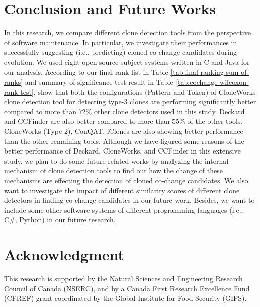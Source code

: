 \documentclass[review]{elsarticle}
\begin{document}
\section{Conclusion and Future Works}
\label{the-conclusion-cochange}
In this research, we compare different clone detection tools from the perspective of software maintenance. In particular, we investigate their performances in successfully suggesting (i.e., predicting) cloned co-change candidates during evolution. We used eight open-source subject systems written in C and Java for our analysis. According to our final rank list in Table \ref{tab:final-ranking-sum-of-ranks} and summary of significance test result in Table \ref{tab:cochange-wilcoxon-rank-test}, show that both the configurations (Pattern and Token) of CloneWorks clone detection tool for detecting type-3 clones are performing significantly better compared to more than 72\% other clone detectors used in this study. Deckard and CCFinder are also better compared to more than 55\% of the other tools. CloneWorks (Type-2), ConQAT, iClones are also showing better performance than the other remaining tools. Although we have figured some reasons of the better performance of Deckard, CloneWorks, and CCFinder in this extensive study, we plan to do some future related works by analyzing the internal mechanism of clone detection tools to find out how the change of these mechanisms are effecting the detection of cloned co-change candidates. We also want to investigate the impact of different similarity scores of different clone detectors in finding co-change candidates in our future work. Besides, we want to include some other software systems of different programming languages (i.e., C\#, Python) in our future research.

\section*{Acknowledgment}
This research is supported by the Natural Sciences and Engineering Research Council of Canada (NSERC), and by a Canada First Research Excellence Fund (CFREF) grant coordinated by the Global Institute for Food Security (GIFS).




\end{document}

